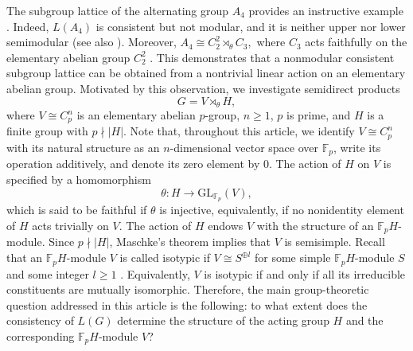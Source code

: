 \documentclass[12pt]{article}
\begin{document}
The subgroup lattice of the alternating group $A_4$ provides an 
instructive example \cite{Stern99}. Indeed, $L(A_4)$ is consistent 
but not modular, and it is neither upper nor 
lower semimodular (see also \cite{Gragg}). 
Moreover, $A_4\cong C^2_{2}\rtimes_{\theta} C_3,$ 
where $C_3$ acts faithfully on the elementary abelian 
group $C^2_{2}$ \cite{Scott, Rotman}. This demonstrates that 
a nonmodular consistent subgroup lattice can be obtained 
from a nontrivial linear action on an elementary abelian group.
Motivated by this observation, 
we investigate semidirect products $$G=V\rtimes_{\theta} H,$$ 
where $V\cong C^n_p$ is an elementary abelian $p$-group, $n\geq 1$, $p$ is prime, and $H$ is a finite group with $p\nmid |H|$. 
Note that, throughout this article, we identify $V\cong C^{n}_{p}$ 
with its natural structure as an 
$n$-dimensional vector space over $\mathbb{F}_p$, write its operation 
additively, and denote its zero element by $0$. 
The action of $H$ on $V$ 
is specified by a homomorphism 
$$\theta: H\longrightarrow \mbox{GL}_{\mathbb{F}_{p}}(V),$$
which is said to be faithful if $\theta$ is injective, equivalently, 
if no nonidentity element of $H$ acts trivially on $V$.
The action of $H$ endows $V$ with the structure of an $\mathbb{F}_{p}H$-module. 
Since $p\nmid |H|$, Maschke's theorem implies that $V$ is semisimple.
Recall that an $\mathbb{F}_{p}H$-module $V$ is called isotypic 
if $V\cong S^{\oplus l}$ for some simple $\mathbb{F}_{p}H$-module $S$ 
and some integer $l\geq 1$ \cite{Lux, Webb}. Equivalently, $V$ is isotypic 
if and only if all its irreducible constituents are mutually 
isomorphic.  Therefore, the main group-theoretic question addressed in this 
article is the following: to what extent does the consistency 
of $L(G)$ determine the structure of the acting group $H$ 
and the corresponding $\mathbb{F}_pH$-module $V$? 
\end{document}
